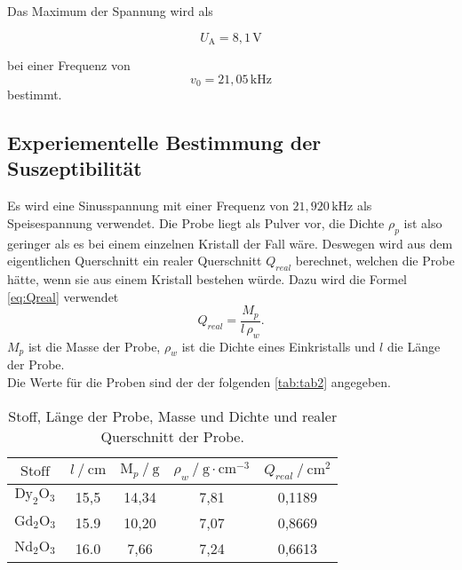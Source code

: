 Das Maximum der Spannung wird als

\begin{equation}
    U_\text{A} = 8,1 \, \unit{\volt}
\end{equation}

bei einer Frequenz von 
\begin{equation}
    v_0 = 21,05 \, \unit{\kilo\hertz}
\end{equation}
bestimmt.



\subsection{Experiementelle Bestimmung der Suszeptibilität}

Es wird eine Sinusspannung mit einer Frequenz von $ 21,920 \, \unit{\kilo\hertz}$ als Speisespannung verwendet.
Die Probe liegt als Pulver vor, die Dichte $ \rho_p$ ist also geringer als es bei einem einzelnen Kristall der Fall wäre.
Deswegen wird aus dem eigentlichen Querschnitt ein realer Querschnitt $Q_{real} $ berechnet, welchen die Probe hätte, wenn sie aus einem Kristall bestehen würde.
Dazu wird die Formel \eqref{eq:Qreal} verwendet
\begin{equation}
    Q_{real} = \frac{M_p}{l \, \rho_w} .
    \label{eq:Qreal}
\end{equation}
$M_p$ ist die Masse der Probe, $\rho_w$ ist die Dichte eines Einkristalls und $l$ die Länge der Probe. \\

Die Werte für die Proben sind der der folgenden \autoref{tab:tab2} angegeben.


\begin{table}[H]
    \centering
    \caption{Stoff, Länge der Probe, Masse und Dichte und realer Querschnitt der Probe.}
    \label{tab:tab2}
    \begin{tabular}{S S S S S}
      \toprule
        {$\text{Stoff}$}&{$l \mathbin{/} \unit{\centi\meter} $}&{$\text{M}_p \mathbin{/} \unit{\gram} $}&{$ \rho_w \mathbin{/} \unit{\gram} \cdot \unit{\centi\meter}^{-3}$}&{$Q_{real} \mathbin{/} \unit{\centi\meter}^{2}$}\\
        \midrule
        {$\text{Dy}_2 \text{O}_3$} & {15,5}& {14,34}&{7,81}&{0,1189}\\
        {$\text{Gd}_2 \text{O}_3$} & {15.9}& {10,20}&{7,07}&{0,8669}\\
        {$\text{Nd}_2 \text{O}_3$} & {16.0}& {7,66} &{7,24}&{0,6613}\\
      \bottomrule
    \end{tabular}
\end{table}


